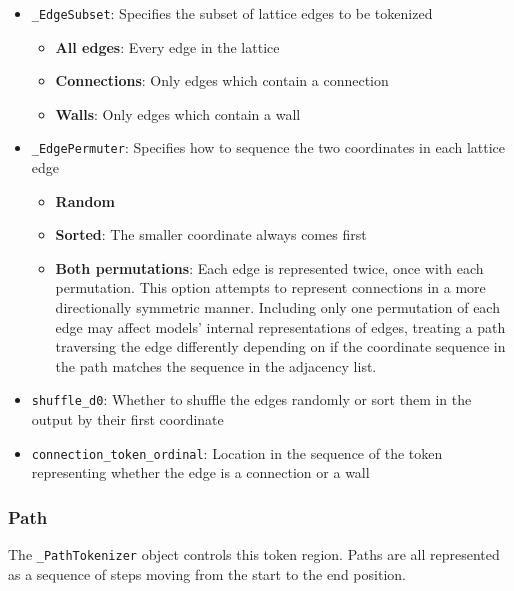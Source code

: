 \documentclass[10pt,a4paper,onecolumn]{article}
\providecommand{\tightlist}{%
  \setlength{\itemsep}{0pt}\setlength{\parskip}{0pt}}
\begin{document}
\begin{itemize}
\tightlist
\item
  \texttt{\_EdgeSubset}: Specifies the subset of lattice edges to be
  tokenized

  \begin{itemize}
  \tightlist
  \item
    \textbf{All edges}: Every edge in the lattice
  \item
    \textbf{Connections}: Only edges which contain a connection
  \item
    \textbf{Walls}: Only edges which contain a wall
  \end{itemize}
\item
  \texttt{\_EdgePermuter}: Specifies how to sequence the two coordinates
  in each lattice edge

  \begin{itemize}
  \tightlist
  \item
    \textbf{Random}
  \item
    \textbf{Sorted}: The smaller coordinate always comes first
  \item
    \textbf{Both permutations}: Each edge is represented twice, once
    with each permutation. This option attempts to represent connections
    in a more directionally symmetric manner. Including only one
    permutation of each edge may affect models' internal representations
    of edges, treating a path traversing the edge differently depending
    on if the coordinate sequence in the path matches the sequence in
    the adjacency list.
  \end{itemize}
\item
  \texttt{shuffle\_d0}: Whether to shuffle the edges randomly or sort
  them in the output by their first coordinate
\item
  \texttt{connection\_token\_ordinal}: Location in the sequence of the
  token representing whether the edge is a connection or a wall
\end{itemize}

\hypertarget{pathtokenizer}{%
\subsubsection{Path}\label{pathtokenizer}}

The \texttt{\_PathTokenizer} object controls this token region. Paths
are all represented as a sequence of steps moving from the start to the
end position.
\end{document}
